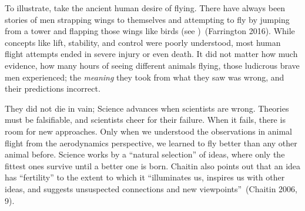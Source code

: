 \documentclass[
  letterpaper,
  a4paper,
  12pt,
  twoside,
  brazil,
  british,
  open=right]{scrbook}
\begin{document}
To illustrate, take the ancient human desire of flying. There have
always been stories of men strapping wings to themselves and attempting
to fly by jumping from a tower and flapping those wings like birds (see
)~(Farrington
2016).
While concepts like lift, stability, and control were poorly understood,
most human flight attempts ended in severe injury or even death. It did
not matter how much evidence, how many hours of seeing different animals
flying, those ludicrous brave men experienced; the \emph{meaning} they
took from what they saw was wrong, and their predictions incorrect.

They did not die in vain;
Science advances when scientists are wrong. Theories must be
falsifiable, and scientists cheer for their failure. When it fails,
there is room for new approaches. Only when we understood the
observations in animal flight from the aerodynamics perspective, we
learned to fly better than any other animal before. Science works by a
``natural selection'' of ideas, where only the fittest ones survive
until a better one is born. Chaitin also points out that an idea has
``fertility'' to the extent to which it ``illuminates us, inspires us
with other ideas, and suggests unsuspected connections and new
viewpoints''~(Chaitin 2006,
9).
\end{document}
